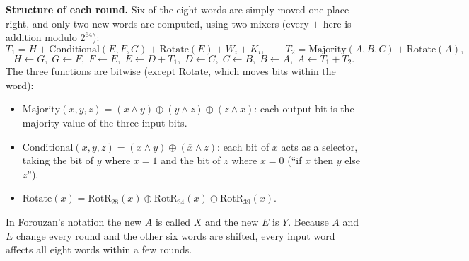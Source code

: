 \textbf{Structure of each round.} Six of the eight words are simply moved one place right, and only two new words are computed, using two mixers (every $+$ here is addition modulo $2^{64}$):
\[
T_1 = H + \mathrm{Conditional}(E, F, G) + \mathrm{Rotate}(E) + W_i + K_i, \qquad T_2 = \mathrm{Majority}(A, B, C) + \mathrm{Rotate}(A),
\]
\[
H \leftarrow G,\; G \leftarrow F,\; F \leftarrow E,\; E \leftarrow D + T_1,\; D \leftarrow C,\; C \leftarrow B,\; B \leftarrow A,\; A \leftarrow T_1 + T_2 .
\]
The three functions are bitwise (except Rotate, which moves bits within the word):
\begin{itemize}[nosep]
  \item $\mathrm{Majority}(x, y, z) = (x \wedge y) \oplus (y \wedge z) \oplus (z \wedge x)$: each output bit is the majority value of the three input bits.
  \item $\mathrm{Conditional}(x, y, z) = (x \wedge y) \oplus (\overline{x} \wedge z)$: each bit of $x$ acts as a selector, taking the bit of $y$ where $x = 1$ and the bit of $z$ where $x = 0$ (``if $x$ then $y$ else $z$'').
  \item $\mathrm{Rotate}(x) = \mathrm{RotR}_{28}(x) \oplus \mathrm{RotR}_{34}(x) \oplus \mathrm{RotR}_{39}(x)$.
\end{itemize}

\begin{center}
\end{center}
In Forouzan's notation the new $A$ is called $X$ and the new $E$ is $Y$. Because $A$ and $E$ change every round and the other six words are shifted, every input word affects all eight words within a few rounds.

